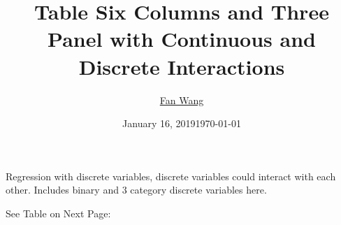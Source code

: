 \documentclass[12pt,english]{article}
\date{January 16, 2019}
\title{Table Six Columns and Three Panel with Continuous and Discrete Interactions}
\author{\href{fanwangecon.github.io}{Fan Wang}}
\date{\today}
\begin{document}
\maketitle

Regression with discrete variables, discrete variables could interact with each other. Includes binary and 3 category discrete variables here.

See Table on Next Page:


\end{document}
